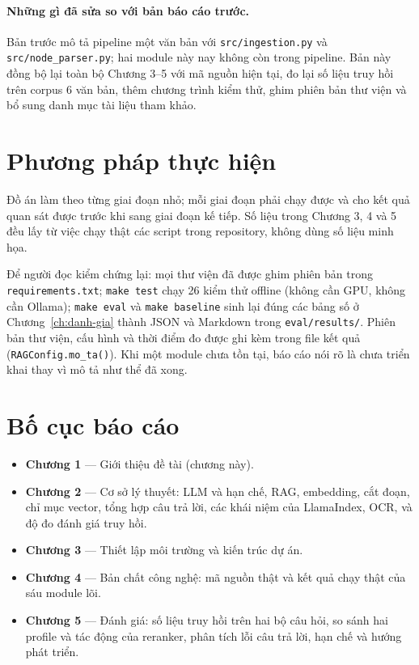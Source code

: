 \paragraph{Những gì đã sửa so với bản báo cáo trước.} Bản trước mô tả pipeline một văn bản với \texttt{src/ingestion.py} và \texttt{src/node\_parser.py}; hai module này nay không còn trong pipeline. Bản này đồng bộ lại toàn bộ Chương 3--5 với mã nguồn hiện tại, đo lại số liệu truy hồi trên corpus 6 văn bản, thêm chương trình kiểm thử, ghim phiên bản thư viện và bổ sung danh mục tài liệu tham khảo.

\section{Phương pháp thực hiện}

Đồ án làm theo từng giai đoạn nhỏ; mỗi giai đoạn phải chạy được và cho kết quả quan sát được trước khi sang giai đoạn kế tiếp. Số liệu trong Chương 3, 4 và 5 đều lấy từ việc chạy thật các script trong repository, không dùng số liệu minh họa.

Để người đọc kiểm chứng lại: mọi thư viện đã được ghim phiên bản trong \texttt{requirements.txt}; \texttt{make test} chạy 26 kiểm thử offline (không cần GPU, không cần Ollama); \texttt{make eval} và \texttt{make baseline} sinh lại đúng các bảng số ở Chương~\ref{ch:danh-gia} thành JSON và Markdown trong \texttt{eval/results/}. Phiên bản thư viện, cấu hình và thời điểm đo được ghi kèm trong file kết quả (\texttt{RAGConfig.mo\_ta()}). Khi một module chưa tồn tại, báo cáo nói rõ là chưa triển khai thay vì mô tả như thể đã xong.

\section{Bố cục báo cáo}

\begin{itemize}
  \item \textbf{Chương 1} --- Giới thiệu đề tài (chương này).
  \item \textbf{Chương 2} --- Cơ sở lý thuyết: LLM và hạn chế, RAG, embedding, cắt đoạn, chỉ mục vector, tổng hợp câu trả lời, các khái niệm của LlamaIndex, OCR, và độ đo đánh giá truy hồi.
  \item \textbf{Chương 3} --- Thiết lập môi trường và kiến trúc dự án.
  \item \textbf{Chương 4} --- Bản chất công nghệ: mã nguồn thật và kết quả chạy thật của sáu module lõi.
  \item \textbf{Chương 5} --- Đánh giá: số liệu truy hồi trên hai bộ câu hỏi, so sánh hai profile và tác động của reranker, phân tích lỗi câu trả lời, hạn chế và hướng phát triển.
\end{itemize}

